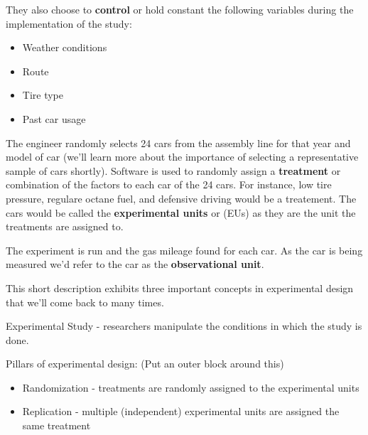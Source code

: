 \documentclass[
]{book}
\providecommand{\tightlist}{%
  \setlength{\itemsep}{0pt}\setlength{\parskip}{0pt}}
\theoremstyle{definition}
\theoremstyle{definition}
\theoremstyle{definition}
\theoremstyle{remark}
\let\BeginKnitrBlock\begin \let\EndKnitrBlock\end
\begin{document}
They also choose to \textbf{control} or hold constant the following variables during the implementation of the study:

\begin{itemize}
\tightlist
\item
  Weather conditions\\
\item
  Route\\
\item
  Tire type\\
\item
  Past car usage
\end{itemize}

The engineer randomly selects 24 cars from the assembly line for that year and model of car (we'll learn more about the importance of selecting a representative sample of cars shortly). Software is used to randomly assign a \textbf{treatment} or combination of the factors to each car of the 24 cars. For instance, low tire pressure, regulare octane fuel, and defensive driving would be a treatement. The cars would be called the \textbf{experimental units} or (EUs) as they are the unit the treatments are assigned to.

The experiment is run and the gas mileage found for each car. As the car is being measured we'd refer to the car as the \textbf{observational unit}.

This short description exhibits three important concepts in experimental design that we'll come back to many times.

\BeginKnitrBlock{definition}
Experimental Study - researchers manipulate the conditions in which the study is done.
\EndKnitrBlock{definition}

Pillars of experimental design: (Put an outer block around this)

\BeginKnitrBlock{definition}
\begin{itemize}
\tightlist
\item
  Randomization - treatments are randomly assigned to the experimental units\\
\end{itemize}
\EndKnitrBlock{definition}

\BeginKnitrBlock{definition}
\begin{itemize}
\tightlist
\item
  Replication - multiple (independent) experimental units are assigned the same treatment\\
\end{itemize}
\EndKnitrBlock{definition}
\end{document}
